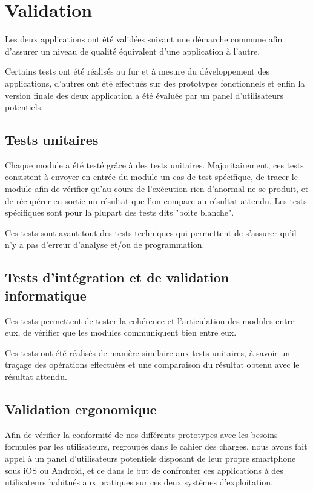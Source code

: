 \documentclass[a4paper, 11px]{article}
\begin{document}
\section{Validation}
Les deux applications ont été validées suivant une démarche commune afin d'assurer un niveau de qualité équivalent d'une application à l'autre.

Certains tests ont été réalisés au fur et à mesure du développement des applications, d'autres ont été effectués sur des prototypes fonctionnels et enfin la version finale des deux application a été évaluée par un panel d'utilisateurs potentiels.

\subsection{Tests unitaires}
Chaque module a été testé grâce à des tests unitaires. Majoritairement, ces tests consistent à envoyer en entrée du module un cas de test spécifique, de tracer le module afin de vérifier qu'au cours de l’exécution rien d'anormal ne se produit, et de récupérer en sortie un résultat que l'on compare au résultat attendu. Les tests spécifiques sont pour la plupart des tests dits "boite blanche".

Ces tests sont avant tout des tests techniques qui permettent de s'assurer qu'il n'y a pas d'erreur d'analyse et/ou de programmation.

\subsection{Tests d'intégration et de validation informatique}
Ces tests permettent de tester la cohérence et l'articulation des modules entre eux, de vérifier que les modules communiquent bien entre eux.


Ces tests ont été réalisés de manière similaire aux tests unitaires, à savoir un traçage des opérations effectuées et une comparaison du résultat obtenu avec le résultat attendu.

\subsection{Validation ergonomique}
Afin de vérifier la conformité de nos différents prototypes avec les besoins formulés par les utilisateurs, regroupés dans le cahier des charges, nous avons fait appel à un panel d'utilisateurs potentiels disposant de leur propre smartphone sous iOS ou Android, et ce dans le but de confronter ces applications à des utilisateurs habitués aux pratiques sur ces deux systèmes d'exploitation.\\
\end{document}
